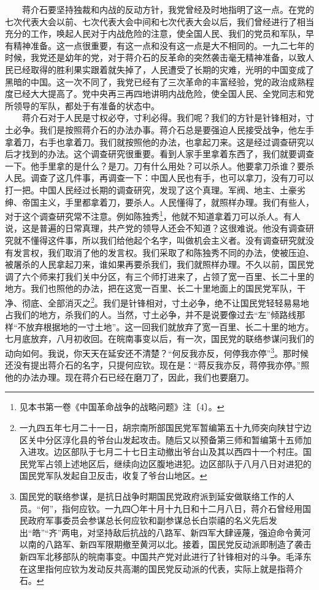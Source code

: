 \documentclass[cn,11pt,chinese]{elegantbook}
\begin{document}
　　蒋介石要坚持独裁和内战的反动方针，我党曾经及时地指明了这一点。在党的七次代表大会以前、七次代表大会中间和七次代表大会以后，我们曾经进行了相当充分的工作，唤起人民对于内战危险的注意，使全国人民、我们的党员和军队，早有精神准备。这一点很重要，有这一点和没有这一点是大不相同的。一九二七年的时候，我党还是幼年的党，对于蒋介石的反革命的突然袭击毫无精神准备，以致人民已经取得的胜利果实跟着就失掉了，人民遭受了长期的灾难，光明的中国变成了黑暗的中国。这一次不同了，我党已经有了三次革命的丰富经验，党的政治成熟程度已经大大提高了。党中央再三再四地讲明内战危险，使全国人民、全党同志和党所领导的军队，都处于有准备的状态中。\\
　　蒋介石对于人民是寸权必夺，寸利必得。我们呢？我们的方针是针锋相对，寸土必争。我们是按照蒋介石的办法办事。蒋介石总是要强迫人民接受战争，他左手拿着刀，右手也拿着刀。我们就按照他的办法，也拿起刀来。这是经过调查研究以后才找到的办法。这个调查研究很重要。看到人家手里拿着东西了，我们就要调查一下。他手里拿的是什么？是刀。刀有什么用处？可以杀人。他要拿刀杀谁？要杀人民。调查了这几件事，再调查一下：中国人民也有手，也可以拿刀，没有刀可以打一把。中国人民经过长期的调查研究，发现了这个真理。军阀、地主、土豪劣绅、帝国主义，手里都拿着刀，要杀人。人民懂得了，就照样办理。我们有些人，对于这个调查研究常不注意。例如陈独秀\footnote[5]{ 见本书第一卷《中国革命战争的战略问题》注〔4〕。}，他就不知道拿着刀可以杀人。有人说，这是普遍的日常真理，共产党的领导人还会不知道？这很难说。他没有调查研究就不懂得这件事，所以我们给他起个名字，叫做机会主义者。没有调查研究就没有发言权，我们取消了他的发言权。我们采取了和陈独秀不同的办法，使被压迫、被屠杀的人民拿起刀来，谁如果再要杀我们，我们就照样办理。不久以前，国民党调了六个师来打我们关中分区，有三个师打进来了，占领了宽一百里、长二十里的地方。我们也照他的办法，把在这宽一百里、长二十里地面上的国民党军队，干净、彻底、全部消灭之\footnote[6]{ 一九四五年七月二十一日，胡宗南所部国民党军暂编第五十九师突向陕甘宁边区关中分区淳化县的爷台山发起攻击。随后又以预备第三师和暂编第十五师加入进攻。边区部队于七月二十七日主动撤出爷台山及其以西四十一个村庄。国民党军占领上述地区后，继续向边区腹地进犯。边区部队于八月八日对进犯的国民党军队发起自卫反击，收复了爷台山地区。}。我们是针锋相对，寸土必争，绝不让国民党轻轻易易地占我们的地方，杀我们的人。当然，寸土必争，并不是说要像过去“左”倾路线那样“不放弃根据地的一寸土地”。这一回我们就放弃了宽一百里、长二十里的地方。七月底放弃，八月初收回。在皖南事变以后，有一次，国民党的联络参谋问我们的动向如何。我说，你天天在延安还不清楚？“何反我亦反，何停我亦停”\footnote[7]{ 国民党的联络参谋，是抗日战争时期国民党政府派到延安做联络工作的人员。“何”，指何应钦。一九四〇年十月十九日和十二月八日，蒋介石曾经用国民政府军事委员会参谋总长何应钦和副参谋总长白崇禧的名义先后发出“皓”“齐”两电，对坚持敌后抗战的八路军、新四军大肆诬蔑，强迫命令黄河以南的八路军、新四军限期撤至黄河以北。接着，国民党反动派即制造了袭击新四军北移部队的皖南事变。中国共产党对此进行了针锋相对的斗争。毛泽东在这里指何应钦为发动反共高潮的国民党反动派的代表，实际上就是指蒋介石。}。那时候还没有提出蒋介石的名字，只提何应钦。现在是：“蒋反我亦反，蒋停我亦停。”照他的办法办理。现在蒋介石已经在磨刀了，因此，我们也要磨刀。\\
\end{document}
